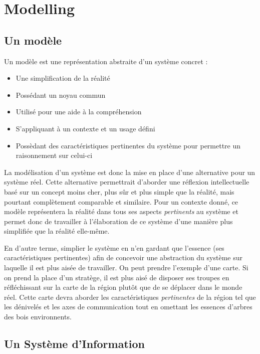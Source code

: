 \chapter{Modelling}

\section{Un modèle}

Un modèle est une représentation abstraite d'un système concret :

\begin{itemize}
  \item Une simplification de la réalité
  \item Possédant un noyau commun
  \item Utilisé pour une aide à la compréhension
  \item S'appliquant à un contexte et un usage défini
  \item Possèdant des caractéristiques pertinentes du système pour permettre un raisonnement sur celui-ci
\end{itemize}

La modélisation d'un système est donc la mise en place d'une alternative pour un système réel. Cette alternative permettrait d'aborder une réflexion intellectuelle basé sur un concept moins cher, plus sûr et plus simple que la réalité, mais pourtant complètement comparable et similaire. Pour un contexte donné, ce modèle représentera la réalité dans tous ses aspects \textit{pertinents} au système et permet donc de travailler à l'élaboration de ce système d'une manière plus simplifiée que la réalité elle-même.

En d'autre terme, simplier le système en n'en gardant que l'essence (ses caractéristiques pertinentes) afin de concevoir une abstraction du système sur laquelle il est plus aisée de travailler. On peut prendre l'exemple d'une carte. Si on prend la place d'un stratège, il est plus aisé de disposer ses troupes en réfléchissant sur la carte de la région plutôt que de se déplacer dans le monde réel. Cette carte devra aborder les caractéristiques \textit{pertinentes} de la région tel que les dénivelés et les axes de communication tout en omettant les essences d'arbres des bois environnents.

\section{Un Système d'Information}

